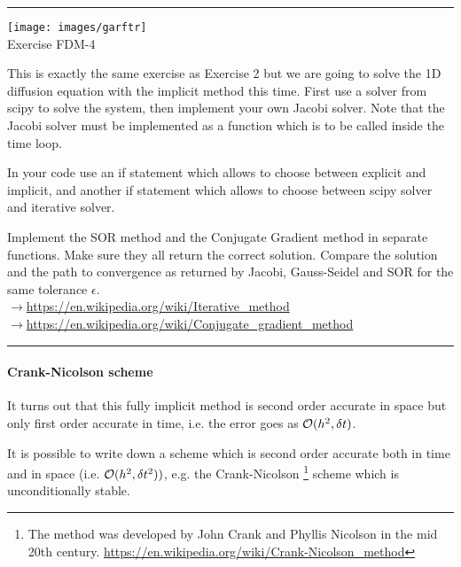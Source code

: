 \begin{center}
\begin{minipage}[t]{0.77\textwidth}
\par\noindent\rule{\textwidth}{0.4pt}

\begin{center}
\texttt{[image: images/garftr]} \\
{\color{orange}Exercise FDM-4}
\end{center}

This is exactly the same exercise as Exercise 2 but we 
are going to solve the 1D diffusion equation with the implicit method
this time. First use a solver from scipy to solve the system, then 
implement your own Jacobi solver. Note that the Jacobi solver must be 
implemented as a function which is to be called inside the time loop.

In your code use an if statement which allows to choose between 
explicit and implicit, and another if statement which allows to choose 
between scipy solver and iterative solver. 

Implement the SOR method and the Conjugate Gradient
method in separate functions.
Make sure they all return the correct solution. 
Compare the solution and the path to convergence as 
returned by Jacobi, Gauss-Seidel and SOR for the same 
tolerance $\epsilon$.\\
$\rightarrow$\url{https://en.wikipedia.org/wiki/Iterative_method}\\
$\rightarrow$\url{https://en.wikipedia.org/wiki/Conjugate_gradient_method}

\par\noindent\rule{\textwidth}{0.4pt}
\end{minipage}
\end{center}


\paragraph{Crank-Nicolson scheme} 
It turns out that this fully implicit method is second order accurate in space but 
only first order accurate in time,
i.e. the error goes as ${\cal O}(h^2,\delta t)$.   

It is possible to write down a scheme which is second order accurate both in time and in space
(i.e. ${\cal O}(h^2, \delta t^2))$, e.g. the {\color{olive}Crank-Nicolson}
\footnote{
The method was developed by John Crank and Phyllis Nicolson 
in the mid 20th century. \url{https://en.wikipedia.org/wiki/Crank-Nicolson_method}
}
scheme which is unconditionally stable. 

